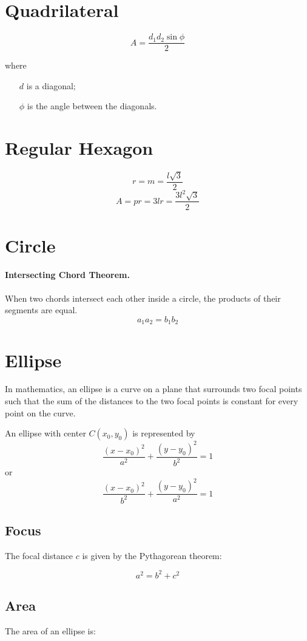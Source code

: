 \documentclass[oneside]{book}
\begin{document}
\section{Quadrilateral}
\[A = \frac{d_1 d_2 \sin{\phi}}{2}\]

where

\begin{itemize}
  \item[\(d\)] is a diagonal;
  \item[\(\phi\)] is the angle between the diagonals.
\end{itemize}

\section{Regular Hexagon}

\[r = m = \frac{l \sqrt{3}}{2}\]
\[A = pr = 3 l r = \frac{3 l^2 \sqrt{3}}{2}\]

\section{Circle}
\paragraph{Intersecting Chord Theorem.} When two chords intersect each
other inside a circle, the products of their segments are equal.
\[a_1 a_2 = b_1 b_2\]

\section{Ellipse}
In mathematics, an ellipse is a curve on a plane that surrounds two focal points
such that the sum of the distances to the two focal points is constant for every
point on the curve.

An ellipse with center \(C \left( x_0, y_0 \right)\) is represented by
\[\frac{\left(x - x_0\right)^2}{a^2}+\frac{\left(y - y_0\right)^2}{b^2}=1\]
or
\[\frac{\left(x - x_0\right)^2}{b^2}+\frac{\left(y - y_0\right)^2}{a^2}=1\]
\subsection{Focus}
The focal distance \(c\) is given by the Pythagorean theorem:

\[a^2=b^2+c^2\]

\subsection{Area}
The area of an ellipse is:
\end{document}
